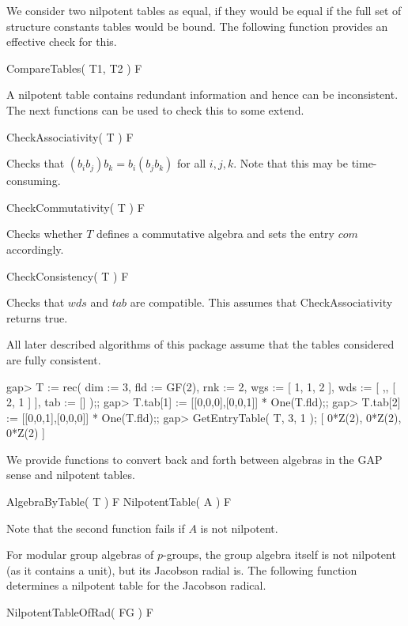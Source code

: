 We consider two nilpotent tables as equal, if they would be equal if
the full set of structure constants tables would be bound. The following
function provides an effective check for this.

\> CompareTables( T1, T2 ) F

A nilpotent table contains redundant information and hence can be 
inconsistent. The next functions can be used to check this to some
extend. 

\> CheckAssociativity( T ) F

Checks that $(b_i b_j) b_k = b_i (b_j b_k)$ for all $i,j,k$. Note that this
may be time-consuming.

\> CheckCommutativity( T ) F

Checks whether $T$ defines a commutative algebra and sets the entry $com$
accordingly.

\> CheckConsistency( T ) F

Checks that $wds$ and $tab$ are compatible. This assumes that 
CheckAssociativity returns true.

All later described algorithms of this package assume that the tables 
considered are fully consistent.

\beginexample
gap> T := rec( dim := 3, 
               fld := GF(2), 
               rnk := 2, 
               wgs := [ 1, 1, 2 ],
               wds := [ ,, [ 2, 1 ] ],
               tab := [] );;
gap> T.tab[1] := [[0,0,0],[0,0,1]] * One(T.fld);;
gap> T.tab[2] := [[0,0,1],[0,0,0]] * One(T.fld);;
gap> GetEntryTable( T, 3, 1 );
[ 0*Z(2), 0*Z(2), 0*Z(2) ]
\endexample


We provide functions to convert back and forth between algebras in the GAP
sense and nilpotent tables.

\> AlgebraByTable( T ) F
\> NilpotentTable( A ) F

Note that the second function fails if $A$ is not nilpotent.

For modular group algebras of $p$-groups, the group algebra itself is
not nilpotent (as it contains a unit), but its Jacobson radial is. The
following function determines a nilpotent table for the Jacobson radical.

\> NilpotentTableOfRad( FG ) F

